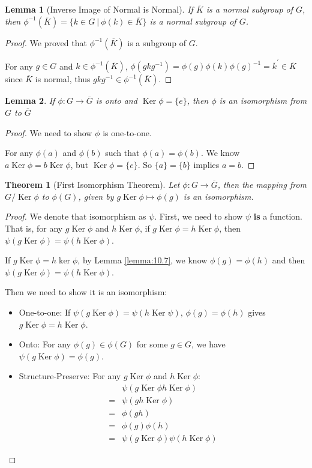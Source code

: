 \documentclass[14pt]{extarticle}
\newtheorem{theorem}{Theorem}[section]
\newtheorem{lemma}{Lemma}[section]
\DeclareMathOperator{\Ker}{Ker}
\newcommand{\inv}[1]{#1^{-1}}
\newcommand{\1}{\{e\}}
\begin{document}
{
\newcommand{\K}{\inv{\phi}(\overline{K})}

\begin{lemma}[Inverse Image of Normal is Normal]
  If $\overline{K}$ is a normal subgroup of $G$, 
  then $\K = \{ k \in G \ | \ \phi(k) \in \overline{K} \}$ is a normal subgroup of $G$.
\end{lemma}
\begin{proof}
  We proved that $\K$ is a subgroup of $G$.

  For any $g \in G$ and $k \in \K$,
  $\phi(gk\inv{g}) = \phi(g) \phi(k) \inv{\phi(g)} = \overline{k}^\prime \in \overline{K}$ 
  since $\overline{K}$ is normal, thus $gk\inv{g} \in \K$.
\end{proof}
}

\begin{lemma}
  If $\phi : G \rightarrow \overline{G}$ is onto 
  and $\Ker \phi = \1$, then $\phi$ is an isomorphism
  from $G$ to $\overline{G}$
\end{lemma}
\begin{proof}
  We need to show $\phi$ is one-to-one.

  For any $\phi(a)$ and $\phi(b)$ such that $\phi(a) = \phi(b)$.
  We know $a \Ker \phi = b \Ker \phi$, but $\Ker \phi = \1$.
  So $\{ a \} = \{ b \}$ implies $a = b$.
\end{proof}

\begin{theorem}[First Isomorphism Theorem]
  \label{thm:10.3}
  Let $\phi : G \rightarrow \overline{G}$, 
  then the mapping from $G / \Ker \phi$ to $\phi(G)$, 
  given by $g \Ker \phi \mapsto \phi(g)$
  is an isomorphism.
\end{theorem}
\begin{proof}
  We denote that isomorphism as $\psi$.
  First, we need to show $\psi$ \textbf{is} a function.
  That is, for any $g \Ker \phi$ and $h \Ker \phi$,
  if $g \Ker \phi = h \Ker \phi$,
  then $\psi(g \Ker \phi) = \psi(h \Ker \phi)$.

  If $g \Ker \phi = h \ker \phi$, by Lemma \ref{lemma:10.7},
  we know $\phi(g) = \phi(h)$ and then $\psi(g \Ker \phi) = \psi(h \Ker \phi)$.

  Then we need to show it is an isomorphism:
  \begin{itemize}
    \item One-to-one: If $\psi(g \Ker \phi) = \psi(h \Ker \psi)$,
      $\phi(g) = \phi(h)$ gives $g \Ker \phi = h \Ker \phi$.
    \item  Onto: For any $\phi(g) \in \phi(G)$ for some $g \in G$,
      we have $\psi(g \Ker \phi) = \phi(g)$.
    \item Structure-Preserve: For any $g \Ker \phi$ and $h \Ker \phi$:
      \begin{align*}
         & \psi(g\Ker\phi h\Ker\phi) \\
        =& \psi(gh\Ker\phi) \\
        =& \phi(gh) \\
        =& \phi(g) \phi(h) \\
        =& \psi(g\Ker\phi) \psi(h\Ker\phi)
      \end{align*}
  \end{itemize}
\end{proof}
\end{document}
